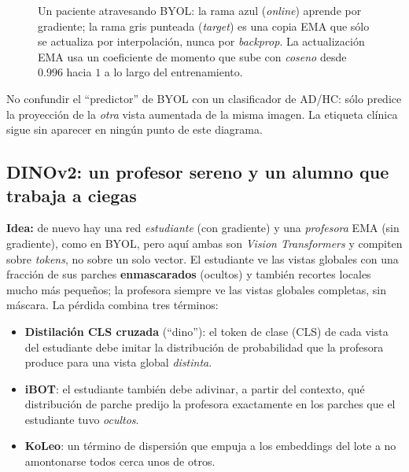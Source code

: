 \documentclass[11pt,a4paper]{article}
\begin{document}
\begin{figure}[htbp]
\caption{Un paciente atravesando BYOL: la rama azul (\emph{online}) aprende
por gradiente; la rama gris punteada (\emph{target}) es una copia EMA que
sólo se actualiza por interpolación, nunca por \emph{backprop}. La
actualización EMA usa un coeficiente de momento que sube con \emph{coseno}
desde $0.996$ hacia $1$ a lo largo del entrenamiento.}
\label{fig:byol}
\end{figure}

\begin{warnbox}
No confundir el ``predictor'' de BYOL con un clasificador de AD/HC: sólo
predice la proyección de la \emph{otra} vista aumentada de la misma imagen.
La etiqueta clínica sigue sin aparecer en ningún punto de este diagrama.
\end{warnbox}

\subsection{DINOv2: un profesor sereno y un alumno que trabaja a ciegas}

\textbf{Idea:} de nuevo hay una red \emph{estudiante} (con gradiente) y una
\emph{profesora} EMA (sin gradiente), como en BYOL, pero aquí ambas son
\emph{Vision Transformers} y compiten sobre \emph{tokens}, no sobre un solo
vector. El estudiante ve las vistas globales con una fracción de sus parches
\textbf{enmascarados} (ocultos) y también recortes locales mucho más
pequeños; la profesora siempre ve las vistas globales completas, sin máscara.
La pérdida combina tres términos:

\begin{itemize}
\item \textbf{Distilación CLS cruzada} (``dino''): el token de clase (CLS)
  de cada vista del estudiante debe imitar la distribución de probabilidad
  que la profesora produce para una vista global \emph{distinta}.
\item \textbf{iBOT}: el estudiante también debe adivinar, a partir del
  contexto, qué distribución de parche predijo la profesora exactamente en
  los parches que el estudiante tuvo \emph{ocultos}.
\item \textbf{KoLeo}: un término de dispersión que empuja a los embeddings
  del lote a no amontonarse todos cerca unos de otros.
\end{itemize}
\end{document}
